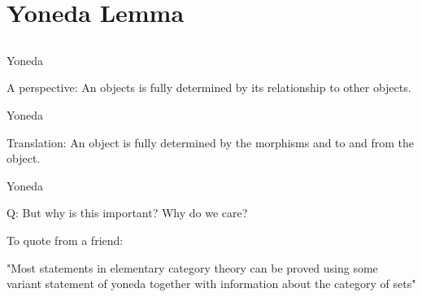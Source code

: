 \documentclass[tikz]{beamer}
\theoremstyle{definition}
\begin{document}
\section{Yoneda Lemma}
\subsection{}
\begin{frame}{Yoneda}

\begin{block}{A perspective:}
    An objects is fully determined by its relationship to other objects.
\end{block}{}


\end{frame}

\begin{frame}{Yoneda}


\begin{block}{Translation:}
    An object is fully determined by the morphisms and to and from the object.
\end{block}{}

\end{frame}

\begin{frame}{Yoneda}

Q: But why is this important? Why do we care?
\end{frame}

\begin{frame}
To quote from a friend:
\begin{block}{}
    "Most statements in elementary category theory can be proved using some variant statement of yoneda together with information about the category of sets"
\end{block}{}

\end{frame}
\end{document}
